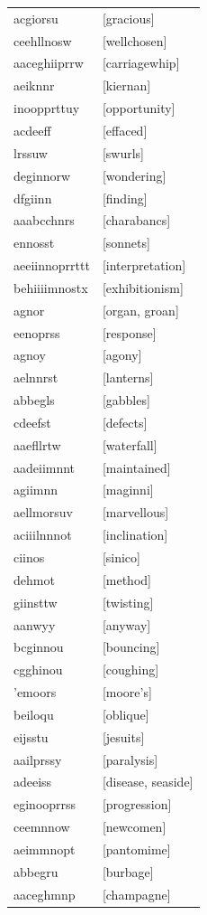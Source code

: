 \documentclass{article}
\begin{document}
\begin{tabular}{ll}
acgiorsu & [gracious] \\
ceehllnosw & [wellchosen] \\
aaceghiiprrw & [carriagewhip] \\
aeiknnr & [kiernan] \\
inoopprttuy & [opportunity] \\
acdeeff & [effaced] \\
lrssuw & [swurls] \\
deginnorw & [wondering] \\
dfgiinn & [finding] \\
aaabcchnrs & [charabancs] \\
ennosst & [sonnets] \\
aeeiinnoprrttt & [interpretation] \\
behiiiimnostx & [exhibitionism] \\
agnor & [organ, groan] \\
eenoprss & [response] \\
agnoy & [agony] \\
aelnnrst & [lanterns] \\
abbegls & [gabbles] \\
cdeefst & [defects] \\
aaefllrtw & [waterfall] \\
aadeiimnnt & [maintained] \\
agiimnn & [maginni] \\
aellmorsuv & [marvellous] \\
aciiilnnnot & [inclination] \\
ciinos & [sinico] \\
dehmot & [method] \\
giinsttw & [twisting] \\
aanwyy & [anyway] \\
bcginnou & [bouncing] \\
cgghinou & [coughing] \\
'emoors & [moore's] \\
beiloqu & [oblique] \\
eijsstu & [jesuits] \\
aailprssy & [paralysis] \\
adeeiss & [disease, seaside] \\
eginooprrss & [progression] \\
ceemnnow & [newcomen] \\
aeimmnopt & [pantomime] \\
abbegru & [burbage] \\
aaceghmnp & [champagne] \\

\end{tabular}
\end{document}
